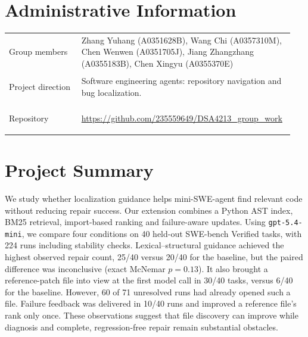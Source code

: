 \section*{Administrative Information}

\begin{tabular}{@{}>{\bfseries\raggedright\arraybackslash}p{0.25\linewidth}
                    >{\raggedright\arraybackslash}p{0.70\linewidth}@{}}
Group members & Zhang Yuhang (A0351628B), Wang Chi (A0357310M), Chen Wenwen (A0351705J),
                Jiang Zhangzhang (A0355183B), Chen Xingyu (A0355370E) \\[0.7em]
Project direction & Software engineering agents: repository navigation and bug localization. \\[0.7em]
Repository & \url{https://github.com/235559649/DSA4213_group_work} \\
\end{tabular}

\section*{Project Summary}

We study whether localization guidance helps mini-SWE-agent find relevant code without reducing
repair success. Our extension combines a Python AST index, BM25 retrieval, import-based ranking
and failure-aware updates. Using \texttt{gpt-5.4-mini}, we compare four conditions on 40 held-out
SWE-bench Verified tasks, with 224 runs including stability checks. Lexical--structural guidance
achieved the highest observed repair count, 25/40 versus 20/40 for the baseline, but the paired
difference was inconclusive (exact McNemar $p=0.13$). It also brought a reference-patch file into view at the
first model call in 30/40 tasks, versus 6/40 for the baseline. However, 60 of 71 unresolved runs
had already opened such a file. Failure feedback was delivered in 10/40 runs and improved a
reference file's rank only once. These observations suggest that file discovery can improve
while diagnosis and complete, regression-free repair remain substantial obstacles.
